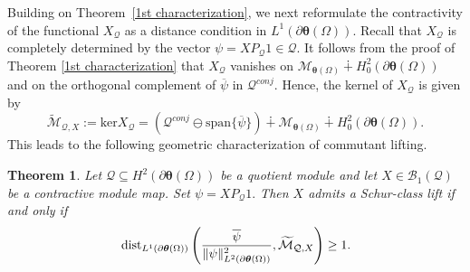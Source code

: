 \documentclass[12pt,reqno]{amsart}
\newtheorem{theorem}{Theorem}[section]
\theoremstyle{remark}
\theoremstyle{definition}
\newcommand{\beq}{\begin{eqnarray}}
\newcommand{\eeq}{\end{eqnarray}}
\newcommand{\dist}{{\rm\,dist}}
\begin{document}
Building on Theorem~\ref{1st characterization}, we next reformulate the contractivity of the functional $X_{\mathcal{Q}}$ as a distance condition in $L^1(\partial\boldsymbol\theta(\Omega)).$ 
Recall that $X_{\mathcal{Q}}$ is completely determined by the vector $\psi=XP_{\mathcal{Q}}1 \in \mathcal{Q}.$ It follows from the proof of Theorem \ref{1st characterization} that $X_{\mathcal{Q}}$ vanishes on $\mathcal{M}_{\boldsymbol\theta(\Omega)}\dotplus H^2_0(\partial\boldsymbol\theta(\Omega))$ and on the orthogonal complement of $\overline{\psi}$ in $\mathcal{Q}^{conj}.$
Hence, the kernel of $X_{\mathcal{Q}}$ is given by
$$\widetilde{\mathcal{M}}_{\mathcal{Q}, X}:=\mathrm{ker}X_{\mathcal{Q}}=(\mathcal{Q}^{conj}\ominus \mathrm{span}\{\overline{\psi}\}) \dotplus \mathcal{M}_{\boldsymbol\theta(\Omega)}\dotplus H^2_{0}(\partial\boldsymbol\theta(\Omega)).$$ 
This leads to the following geometric characterization of commutant lifting. 
\begin{theorem}\label{2nd characterization}
    Let $\mathcal{Q}\subseteq H^2(\partial\boldsymbol\theta(\Omega))$ be a quotient module and let $X\in \mathcal{B}_1(\mathcal{Q})$ be a contractive module map. Set
$\psi=XP_{\mathcal Q}1.$ Then
    $X$ admits a Schur-class lift if and only if \beq \label{eq 15} \dist_{L^1(\partial\boldsymbol\theta(\Omega))}\left( \frac{\overline{\psi}}{\|\psi\|^2_{L^2(\partial\boldsymbol\theta(\Omega))}}, \widetilde{\mathcal{M}}_{\mathcal{Q}, X}\right) \geq 1.\eeq
\end{theorem}
\end{document}
